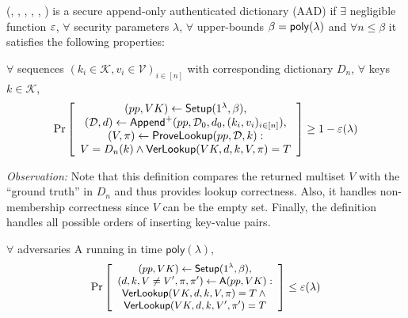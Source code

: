 \begin{definition}
    \label{d:secure-maad-definition}
    (\setup, \append, \provelookup, \proveappendonly, \verlookup, \verappendonly) is a secure append-only authenticated dictionary (AAD) if
    $\exists$ negligible function $\varepsilon$,
    $\forall$ security parameters $\lambda$,  $\forall$ upper-bounds $\beta=\mathsf{poly}(\lambda)$ and $\forall n \le \beta$ it satisfies the following properties:
\end{definition}

\label{s:aad:lookup-correctness}
$\forall$ sequences $(k_i\in \mathcal{K}, v_i\in\mathcal{V})_{i\in [n]}$ with corresponding dictionary $D_n$, $\forall$ keys $k\in\mathcal{K}$,
\begin{align*}
\Pr \left[ \begin{array}{c}
    (pp,VK) \leftarrow \setup(1^\lambda, \beta),\\
    (\AD, d) \leftarrow \multiappend(pp, \AD_0, d_0, (k_i, v_i)_{i\in [n]}),\\
    (V, \pi) \leftarrow \provelookup(pp,\AD, k): \\
    {V = D_n(k)} \wedge {\verlookup(VK, d, k, V,\pi) = T}
\end{array} \right] \ge 1 - \negl(\lambda)
\end{align*}

\noindent \textit{Observation:}
Note that this definition compares the returned multiset $V$ with the ``ground truth'' in $D_n$ and thus provides lookup correctness.
Also, it handles non-membership correctness since $V$ can be the empty set.
Finally, the definition handles all possible orders of inserting key-value pairs.

\label{s:aad:lookup-security}
$\forall$ adversaries \textsf{A} running in time $\mathsf{poly}(\lambda)$,
\begin{align*}
\small
\Pr \left[ \begin{array}{c}
    (pp,VK) \leftarrow \mathsf{Setup}(1^\lambda, \beta), \\
    (d, k,V\ne V',\pi,\pi') \leftarrow \mathsf{A}(pp, VK)
    : \\
    {\mathsf{VerLookup}(VK,d, k,V,\pi) = T} \wedge {} \\
    {\mathsf{VerLookup}(VK,d, k,V',\pi') = T}
\end{array} \right] \le \varepsilon(\lambda)
\end{align*}

